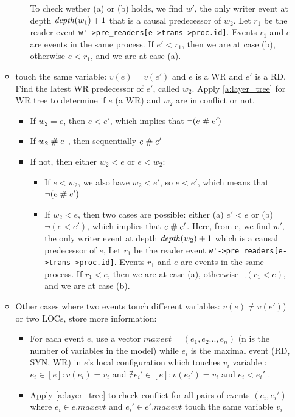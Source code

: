 \documentclass{llncs}
\begin{document}
\begin{enumerate}
\begin{itemize}
\begin{itemize}
					To check wether (a) or (b) holds, we find $w'$,
					the only writer event at depth $\mathop{\mathit{depth}} (w_1) + 1$ that is a causal predecessor of $w_2$.
					Let $r_1$ be the reader event 
					\verb!w'->pre_readers[e->trans->proc.id]!. Events $r_1$ and $e$ are events in the same process.
					If $ e' < r_1$, then we are at case (b), otherwise $e < r_1$, and we are at case (a).
			\end{itemize}
			\item 
				touch the same variable: $v(e) = v(e')$ and $e$ is a WR and $e'$ is a RD. Find the latest WR predecessor of $e'$, called $w_2$. Apply  						\cref{a:layer_tree} for WR tree to determine if $e$ (a WR) and $w_2$ are in conflict or not.
				\begin{itemize}
					\item
						If $w_2 = e$, then $e < e'$, which implies that $\lnot (e \mathrel{\#} e')$
					\item
						If $w_2 \mathrel{\#} e$ , then sequentially $e \mathrel{\#} e'$
					\item
						If not, then either $ w_2< e$ or $e < w_2$:
						\begin{itemize}
							\item
								If $ e < w_2 $, we also have $w_2 < e'$, so $e < e'$, which means that $\lnot (e \mathrel{\#} e')$
							\item
								If $w_2 < e$, then two cases are possible: either (a) $e' < e$ or (b) $\lnot (e < e')$, which implies that $e \mathrel{\#} e'$. 									Here, from e, we find $w'$, the only writer event at depth $\mathop{\mathit{depth}} (w_2) + 1$ which is a causal predecessor of $e$,
								Let $r_1$ be the reader event \verb!w'->pre_readers[e->trans->proc.id]!.
								Events $r_1$ and $e$ are events in the same process. 
								If $r_1 < e$, then we are at case (a), otherwise $_\lnot (r_1 < e) $, and we are at case (b). 
						\end{itemize}
				\end{itemize}
				
			\item Other cases where two events touch different variables: $v(e) \neq v(e')$) or two LOCs, store more information:	
			\begin{itemize}
				\item 
					For each event $e$, use a vector $maxevt = (e_1, e_2...,e_n)$  (n is the number of variables in the model)
					while $e_i$ is the maximal event (RD, SYN, WR) in $e$'s local configuration which touches $v_i$ variable :
					$e_i \in  \left[ e \right]: v(e_i) = v_i$ 
					and $ \nexists e_i' \in \left[ e \right] : v(e_i') = v_i$ 
					and $e_i < e_i'$ .
				\item
					Apply \cref{a:layer_tree} to check conflict for all pairs of events $(e_i, e_i')$ where $e_i \in e.maxevt$ and
					$e_i'\in e'.maxevt$ touch the same variable $v_i$
			\end{itemize}	
		\end{itemize}
\end{enumerate}
\end{document}
